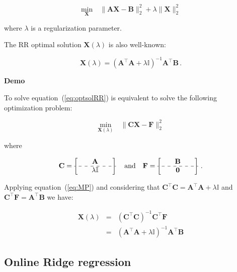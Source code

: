 \begin{equation}
\label{eq:RRproblem}
\underset{\mathbf{X}}{\text{min}} \quad \|
\mathbf{A}\mathbf{\mathbf{X}} - \mathbf{B} \|_2^2 +\lambda \|
\mathbf{\mathbf{X}}\|_2^2 
\end{equation}

\noindent where $\lambda$ is a regularization parameter. 

The RR optimal solution $\mathbf{X}(\lambda)$ is also well-known: 

\begin{equation}
\label{eq:optsolRR}
\mathbf{X}(\lambda)=(\mathbf{A}^\top \mathbf{A}+ \lambda
\mathbb{I})^{-1}\mathbf{A}^\top \mathbf{B} \, . 
\end{equation}


\textbf{Demo}\quad

To solve equation~(\ref{eq:optsolRR}) is equivalent to solve the following
optimization problem:


\begin{equation}
\label{eq:RRproblem2}
\underset{\mathbf{X}(\lambda)}{\text{min}} \quad \|
\mathbf{C}\mathbf{\mathbf{X}} - \mathbf{F} \|_2^2
\end{equation}

\noindent where

\begin{equation*}
	\mathbf{C}=\begin{bmatrix} \quad &\mathbf{A}& \quad \\ \hdashline \quad
& \lambda\mathbb{I}&\quad  \end{bmatrix} \quad \text{and} \quad
	\mathbf{F}=\begin{bmatrix} \quad &\mathbf{B}& \quad \\ \hdashline \quad
& \mathbf{0}&\quad  \end{bmatrix} \, .
\end{equation*}

Applying equation~(\ref{eq:MP}) and considering that $\mathbf{C}^\top
\mathbf{C} = \mathbf{A}^\top \mathbf{A} + \lambda \mathbb{I}$ and 
$\mathbf{C}^\top \mathbf{F}=\mathbf{A}^\top \mathbf{B} $ we have:

\begin{eqnarray*}
\mathbf{X}(\lambda)&=&(\mathbf{C}^\top
\mathbf{C})^{-1}\mathbf{C}^\top \mathbf{F} \\
&=& (\mathbf{A}^\top \mathbf{A} + \lambda \mathbb{I})^{-1} \mathbf{A}^\top \mathbf{B}
\end{eqnarray*}

\subsection{Online Ridge regression}


